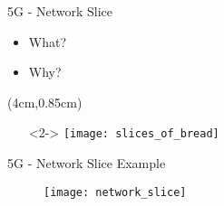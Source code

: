 \begin{frame}{5G - Network Slice}
\begin{itemize}
 \item<1-> What? %
 \item<3-> Why? %
\end{itemize}

\begin{textblock*}{5cm}(4cm,0.85cm)
  \begin{itemize}
  \item[]<2-> \texttt{[image: slices\_of\_bread]}
  \end{itemize}
\end{textblock*}
\end{frame}

\begin{frame}{5G - Network Slice Example}
  \begin{figure}
    \centering
    \texttt{[image: network\_slice]}
  \end{figure}
\end{frame}
